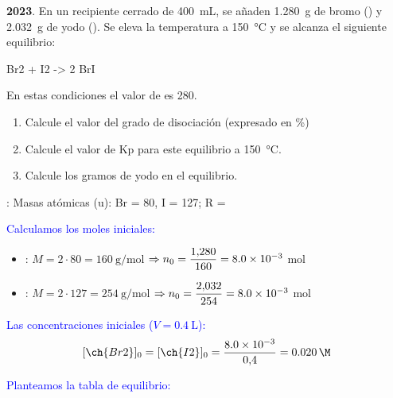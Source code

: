 \begin{exerciseEVAU}
    \textbf{2023}. En un recipiente cerrado de \qty{400}{\mL}, se añaden \qty{1.280}{\g} de bromo () y \qty{2.032}{\g} de yodo (). Se eleva la temperatura a \qty{150}{\celsius} y se alcanza el siguiente equilibrio:
    \begin{reaction*}
        Br2 \gas{} + I2 \gas{} -> 2 BrI \gas{}
    \end{reaction*}
    En estas condiciones el valor de \Kc{} es 280.
    \begin{enumerate}[label=\letraminuscula]
        \item Calcule el valor del grado de disociación (expresado en \%)
        \item Calcule el valor de Kp para este equilibrio a \qty{150}{\celsius}.
        \item Calcule los gramos de yodo en el equilibrio.
    \end{enumerate}
    \datos{}: Masas atómicas (u): Br = 80, I = 127; R = \ctegases{}
    \begin{solu}

    \textcolor{blue}{Calculamos los moles iniciales:}
    \begin{itemize}
        \item {}: \(M = 2\cdot80 = \qty{160}{\g\per\mol}\) \(\Rightarrow n_0 = \dfrac{1{,}280}{160} = \num{8{,}0e-3}\) mol
        \item {}: \(M = 2\cdot127 = \qty{254}{\g\per\mol}\) \(\Rightarrow n_0 = \dfrac{2{,}032}{254} = \num{8{,}0e-3}\) mol
    \end{itemize}

    \textcolor{blue}{Las concentraciones iniciales (\(V = \qty{0.4}{\L}\)):}
    \[
        [\ch{Br2}]_0 = [\ch{I2}]_0 = \frac{\num{8{,}0e-3}}{0{,}4} = \qty{0{,}020}{\M}
    \]

    \textcolor{blue}{Planteamos la tabla de equilibrio:}


\end{solu}
\end{exerciseEVAU}
